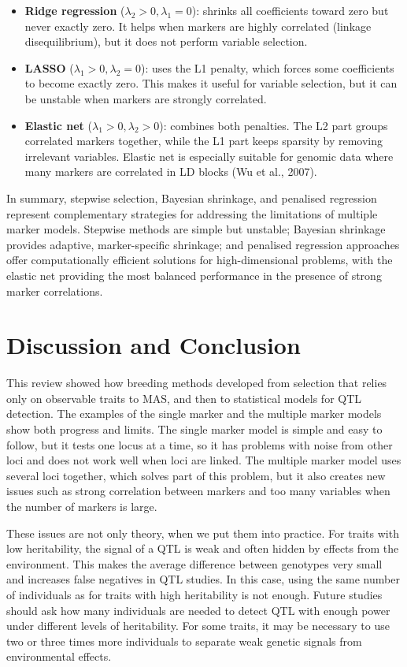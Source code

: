 \documentclass[
  letterpaper,
  DIV=11,
  numbers=noendperiod]{scrartcl}
\begin{document}
\begin{itemize}
\item
  \textbf{Ridge regression} (\(\lambda_2>0, \lambda_1=0\)): shrinks all
  coefficients toward zero but never exactly zero. It helps when markers
  are highly correlated (linkage disequilibrium), but it does not
  perform variable selection.
\item
  \textbf{LASSO} (\(\lambda_1>0, \lambda_2=0\)): uses the L1 penalty,
  which forces some coefficients to become exactly zero. This makes it
  useful for variable selection, but it can be unstable when markers are
  strongly correlated.
\item
  \textbf{Elastic net} (\(\lambda_1>0, \lambda_2>0\)): combines both
  penalties. The L2 part groups correlated markers together, while the
  L1 part keeps sparsity by removing irrelevant variables. Elastic net
  is especially suitable for genomic data where many markers are
  correlated in LD blocks (Wu et al., 2007).
\end{itemize}

In summary, stepwise selection, Bayesian shrinkage, and penalised
regression represent complementary strategies for addressing the
limitations of multiple marker models. Stepwise methods are simple but
unstable; Bayesian shrinkage provides adaptive, marker-specific
shrinkage; and penalised regression approaches offer computationally
efficient solutions for high-dimensional problems, with the elastic net
providing the most balanced performance in the presence of strong marker
correlations.

\section{Discussion and Conclusion}\label{discussion-and-conclusion}

This review showed how breeding methods developed from selection that
relies only on observable traits to MAS, and then to statistical models
for QTL detection. The examples of the single marker and the multiple
marker models show both progress and limits. The single marker model is
simple and easy to follow, but it tests one locus at a time, so it has
problems with noise from other loci and does not work well when loci are
linked. The multiple marker model uses several loci together, which
solves part of this problem, but it also creates new issues such as
strong correlation between markers and too many variables when the
number of markers is large.

These issues are not only theory, when we put them into practice. For
traits with low heritability, the signal of a QTL is weak and often
hidden by effects from the environment. This makes the average
difference between genotypes very small and increases false negatives in
QTL studies. In this case, using the same number of individuals as for
traits with high heritability is not enough. Future studies should ask
how many individuals are needed to detect QTL with enough power under
different levels of heritability. For some traits, it may be necessary
to use two or three times more individuals to separate weak genetic
signals from environmental effects.
\end{document}
